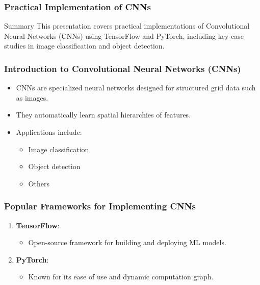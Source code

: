 \documentclass[aspectratio=169]{beamer}
\begin{document}
\begin{frame}
    \frametitle{Practical Implementation of CNNs}
    \begin{block}{Summary}
        This presentation covers practical implementations of Convolutional Neural Networks (CNNs) using TensorFlow and PyTorch, including key case studies in image classification and object detection.
    \end{block}
\end{frame}

\begin{frame}
    \frametitle{Introduction to Convolutional Neural Networks (CNNs)}
    \begin{itemize}
        \item CNNs are specialized neural networks designed for structured grid data such as images.
        \item They automatically learn spatial hierarchies of features.
        \item Applications include:
        \begin{itemize}
            \item Image classification
            \item Object detection
            \item Others
        \end{itemize}
    \end{itemize}
\end{frame}

\begin{frame}
    \frametitle{Popular Frameworks for Implementing CNNs}
    \begin{enumerate}
        \item \textbf{TensorFlow}: 
        \begin{itemize}
            \item Open-source framework for building and deploying ML models.
        \end{itemize}
        \item \textbf{PyTorch}:
        \begin{itemize}
            \item Known for its ease of use and dynamic computation graph.
        \end{itemize}
    \end{enumerate}
\end{frame}
\end{document}
